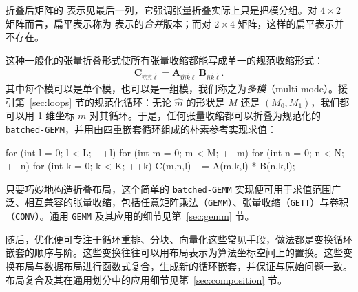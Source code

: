 折叠后矩阵的 \CuTe 表示见最后一列，它强调张量折叠实际上只是把模分组。对 $4 {\times} 2$ 矩阵而言，扁平表示称为 \CuTe 表示的{\em 合并}版本；而对 $2 {\times} 4$ 矩阵，这样的扁平表示并不存在。

这种一般化的张量折叠形式使所有张量收缩都能写成单一的规范收缩形式：
\begin{align}
\mathbf{C}_{\hat{m}\hat{n}\hat{\ell}} = \mathbf{A}_{\hat{m}\hat{k}\hat{\ell}} \, \mathbf{B}_{\hat{n}\hat{k}\hat{\ell}}.
\end{align}
其中每个模可以是单个模，也可以是一组模，我们称之为{\em 多模}（multi-mode）。援引第~\ref{sec:loops} 节的规范化循环：无论 $\hat{m}$ 的形状是 $M$ 还是 $(M_0,M_1)$，我们都可以用 1 维坐标 $m$ 对其循环。于是，任何张量收缩都可以折叠为规范化的 {\tt batched-GEMM}，并用由四重嵌套循环组成的朴素参考实现求值：
\begin{cpp}
for (int l = 0; l < L; ++l)
  for (int m = 0; m < M; ++m)
    for (int n = 0; n < N; ++n)
      for (int k = 0; k < K; ++k)
        C(m,n,l) += A(m,k,l) * B(n,k,l);
\end{cpp}
只要巧妙地构造折叠布局，这个简单的 {\tt batched-GEMM} 实现便可用于求值范围广泛、相互兼容的张量收缩，包括任意矩阵乘法（{\tt GEMM}）、张量收缩（{\tt GETT}）与卷积（{\tt CONV}）。通用 {\tt GEMM} 及其应用的细节见第~\ref{sec:gemm} 节。

随后，优化便可专注于循环重排、分块、向量化这些常见手段，做法都是变换循环嵌套的顺序与阶。这些变换往往可以用布局表示为算法坐标空间上的置换。这些变换布局与数据布局进行函数式复合，生成新的循环嵌套，并保证与原始问题一致。布局复合及其在通用划分中的应用细节见第~\ref{sec:composition} 节。
